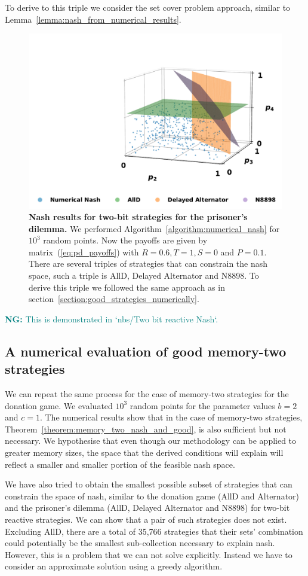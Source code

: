 \documentclass{article}
\theoremstyle{definition}
\newcommand{\nikoleta}[1]{\textcolor{teal}{{\bf NG:} #1}}
\begin{document}
  To derive to this triple we consider the set cover problem approach, similar
  to Lemma~\ref{lemma:nash_from_numerical_results}.

\begin{figure}[!htbp]
  \centering
  \includegraphics[width=.55\textwidth]{static/two_bit_reactive_numerical_results_prisoners_dilemma.pdf}
  \caption{\textbf{Nash results for two-bit strategies for the prisoner's dilemma.}
  We performed Algorithm~\ref{algorithm:numerical_nash} for \(10 ^ 3\) random
  points. Now the payoffs are given by matrix~(\ref{eq:pd_payoffs})
  with \(R=0.6, T=1, S=0\) and \(P=0.1\). There are several triples of
  strategies that can constrain the nash space, such a triple is AllD, Delayed
  Alternator and N8898. To derive this triple we followed the same approach as
  in section~\ref{section:good_strategies_numerically}.}
  \label{fig:numerical_results_prisoners_dilemma}
\end{figure}

\nikoleta{This is demonstrated in `nbs/Two bit reactive Nash`.}

\subsection{A numerical evaluation of good memory-two strategies}\label{section:good_strategies_numerically_mem_two}

We can repeat the same process for the case of memory-two strategies for the
donation game. We evaluated \(10^3\) random points for the parameter values \(b=2\)
and \(c=1\). The numerical results show that in the case of memory-two strategies,
Theorem~\ref{theorem:memory_two_nash_and_good}, is also sufficient but not
necessary. We hypothesise that even though our methodology can be applied to
greater memory sizes, the space that the derived conditions will explain will
reflect a smaller and smaller portion of the feasible nash space.

We have also tried to obtain the smallest possible subset of strategies that can
constrain the space of nash, similar to the donation game (AllD and Alternator)
and the prisoner's dilemma (AllD, Delayed Alternator and N8898) for two-bit
reactive strategies. We can show that a pair of such strategies does not exist.
Excluding AllD, there are a total of 35,766 strategies that their sets'
combination could potentially  be the smallest sub-collection necessary to
explain nash. However, this is a problem that we can not solve explicitly.
Instead we have to consider an approximate solution using a greedy algorithm.
\end{document}

